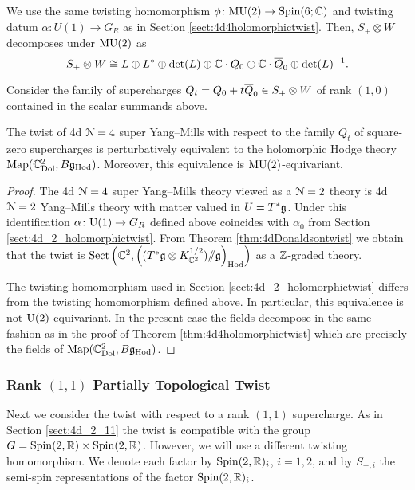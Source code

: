 \documentclass[10pt, oneside]{article}
\begin{document}
We use the same twisting homomorphism $\phi \colon \MU(2) \to \Spin(6;\CC)$ and twisting datum $\alpha \colon U(1) \to G_R$ as in Section \ref{sect:4d4holomorphictwist}.
Then, $S_+ \otimes W$ decomposes under $\MU(2)$ as
\[
S_+\otimes W\cong L\oplus L^*\oplus \det(L)\oplus \CC \cdot Q_0 \oplus \CC \cdot \Bar{Q}_0 \oplus \det(L)^{-1}.
\]

Consider the family of supercharges $Q_t = Q_0 + t \Bar{Q}_0 \in S_+\otimes W$ of rank $(1, 0)$ contained in the scalar summands above.

\begin{theorem}
The twist of 4d $\cN=4$ super Yang--Mills with respect to the family $Q_t$ of square-zero supercharges is perturbatively equivalent to the holomorphic Hodge theory $\map(\CC^2_{\rm Dol}, B \fg_{\rm Hod})$. 
Moreover, this equivalence is $\MU(2)$-equivariant.
\label{thm:4d4Atwist}
\end{theorem}
\begin{proof}
The 4d $\cN=4$ super Yang--Mills theory viewed as a $\cN=2$ theory is 4d $\cN=2$ Yang--Mills theory with matter valued in $U=T^*\fg$. 
Under this identification $\alpha\colon \U(1)\rightarrow G_R$ defined above coincides with $\alpha_0$ from Section \ref{sect:4d_2_holomorphictwist}. 
From Theorem \ref{thm:4dDonaldsontwist} we obtain that the twist is $\Sect\left(\CC^2, \left((T^*\fg \otimes K_{\CC^2}^{1/2})\ham \fg\right)_{\Hod}\right)$ as a $\ZZ$-graded theory. 

The twisting homomorphism used in Section \ref{sect:4d_2_holomorphictwist} differs from the twisting homomorphism defined above. 
In particular, this equivalence is not $\U(2)$-equivariant. In the present case the fields decompose in the same fashion as in the proof of Theorem \ref{thm:4d4holomorphictwist} which are precisely the fields of $\map(\CC^2_{\rm Dol}, B \fg_{\rm Hod})$.
\end{proof}

\subsubsection{Rank \texorpdfstring{$(1, 1)$}{(1,1)} Partially Topological Twist}
\label{sect:4d4partialtwist}

Next we consider the twist with respect to a rank $(1,1)$ supercharge. As in Section \ref{sect:4d_2_11} the twist is compatible with the group $G = \Spin(2, \RR) \times \Spin(2, \RR)$. However, we will use a different twisting homomorphism. We denote each factor by $\Spin(2, \RR)_i$, $i=1,2$, and by $S_{\pm, i}$ the semi-spin representations of the factor $\Spin(2, \RR)_i$.
\end{document}
